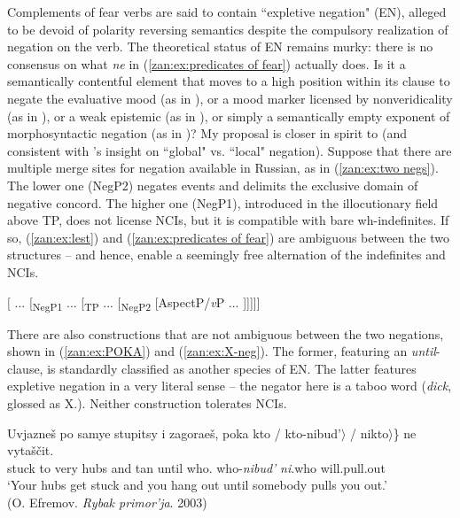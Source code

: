 \documentclass[output=paper,colorlinks,citecolor=brown]{langscibook}
\begin{document}
Complements of fear verbs are said to contain ``expletive negation" (EN), alleged to be devoid of polarity reversing semantics despite the compulsory realization of negation on the verb. The theoretical status of EN remains murky: there is no consensus on what \textit{ne} in (\ref{zan:ex:predicates of fear}) actually does. Is it a semantically contentful element that moves to a high position within its clause to negate the evaluative mood (as in \citealt{zan:abels2005}), or a mood marker licensed by nonveridicality (as in \citealt{yoon2011not}), or a weak epistemic (as in \citealt{makri2016not}), or simply a semantically empty exponent of morphosyntactic negation (as in \citealt{zan:brown1995})? My proposal is closer in spirit to \citet{zan:abels2005} (and consistent with \citeauthor{paducheva2016}'s \citeyear{paducheva2016} insight on ``global" vs. ``local" negation). Suppose that there are multiple merge sites for negation available in Russian, as in (\ref{zan:ex:two negs}). The lower one (NegP2) negates events and delimits the exclusive domain of negative concord. The higher one (NegP1), introduced in the illocutionary field above TP, does not license NCIs, but it is compatible with bare wh-indefinites. If so, (\ref{zan:ex:lest}) and (\ref{zan:ex:predicates of fear}) are ambiguous between the two structures -- and hence, enable a seemingly free alternation of the indefinites and NCIs. 


\ea \label{zan:ex:two negs}
$[$ ... [\textsubscript{NegP1} {\NEG} ... [\textsubscript{TP} ... [\textsubscript{NegP2} {\NEG} [AspectP/\textit{v}P ... ]]]]]
\z

\noindent There are also constructions that are not ambiguous between the two negations, shown in (\ref{zan:ex:POKA}) and (\ref{zan:ex:X-neg}). The former, featuring an \textit{until}-clause, is standardly classified as another species of EN. The latter features expletive negation in a very literal sense -- the negator here is a taboo word (\textit{dick}, glossed as X.{\NEG}). Neither construction tolerates NCIs.


\ea \label{zan:ex:POKA}
\gll Uvjazneš	po	samye	stupitsy	i	zagoraeš,	poka \minsp{\{} kto / \hphantom{xxxxxxxxxx}  kto-nibud'$\rangle$ / \minsp{$\langle$ *} nikto$\rangle$\} 	ne	vytaščit.\\
 stuck	to	very	hubs	and	tan until {} who.{\INDF} 
     {} {} {} who-\textit{nibud'} {} {} \textit{ni}.who	{\NEG}	will.pull.out\\
        \glt `Your hubs get stuck and you hang out until somebody pulls you out.'\\
\hfill {(O. Efremov. \textit{Rybak primor'ja}. 2003)}
\z
\end{document}
